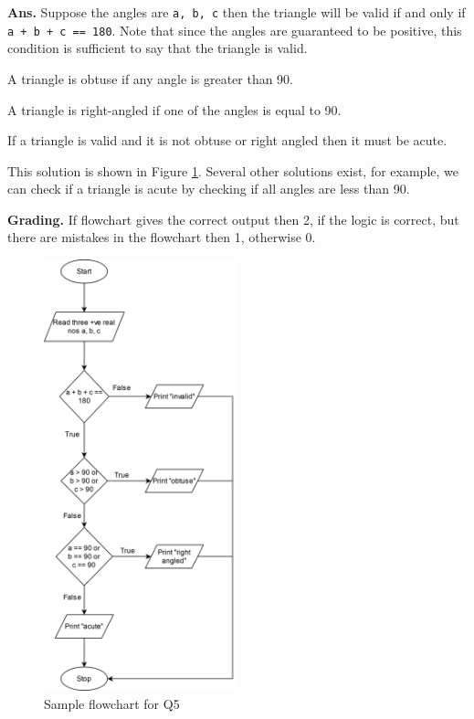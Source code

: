 \documentclass{article}
\begin{document}
\begin{flushleft}

\textbf{Ans. } Suppose the angles are \lstinline{a, b, c} then the triangle will be 
valid if and only if \lstinline{a + b + c == 180}. Note that since the angles are 
guaranteed to be positive, this condition is sufficient to say that the triangle is 
valid.

A triangle is obtuse if any angle is greater than 90.

A triangle is right-angled if one of the angles is equal to 90.

If a triangle is valid and it is not obtuse or right angled then it must be acute.

This solution is shown in Figure \ref{Q5}. Several other solutions exist, for example,
we can check if a triangle is acute by checking if all angles are less than 90.
    
\end{flushleft}

\begin{flushleft}

\textbf{Grading. } If flowchart gives the correct output then 2, if the logic is correct,
but there are mistakes in the flowchart then 1, otherwise 0.
        
\end{flushleft}

\begin{figure}[ht]
    \centering
    \includegraphics[width=0.5\textwidth]{Q5.png}
    \caption{Sample flowchart for Q5}
    \label{Q5}
\end{figure}
\end{document}
